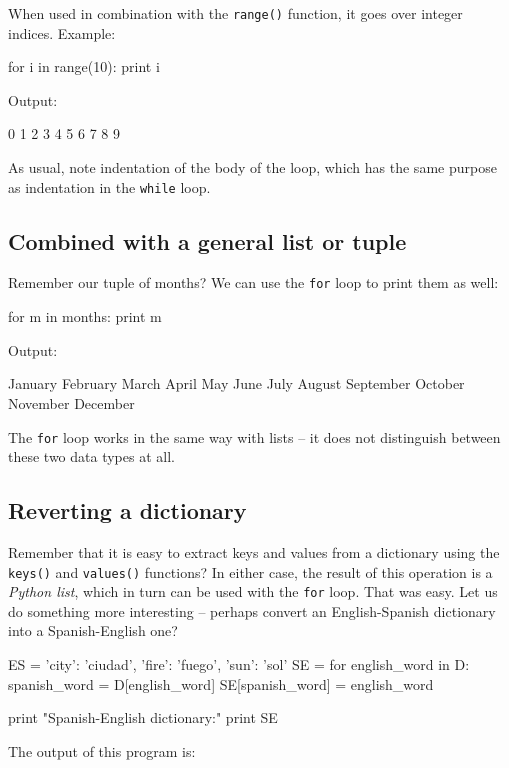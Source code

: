When used in combination with the {\tt range()} function, it goes over integer indices. 
Example:

\begin{bluecode}
for i in range(10):
    print i
\end{bluecode}
Output:

\begin{greencode}
0
1
2
3
4
5
6
7
8
9
\end{greencode}
As usual, note indentation of the body of the loop, which has the same 
purpose as indentation in the {\tt while} loop. 

\subsection{Combined with a general list or tuple}

Remember our tuple of months? We can use the {\tt for} loop to print them as well:

\begin{bluecode}
for m in months:
    print m
\end{bluecode}
Output:

\begin{greencode}
January
February
March
April
May
June
July
August
September
October
November
December
\end{greencode}
The {\tt for} loop works in the same way with lists -- it does not distinguish between these 
two data types at all.

\subsection{Reverting a dictionary}

Remember that it is easy to extract keys and values from a dictionary using the 
{\tt keys()} and {\tt values()} functions? In either case, the result of this operation 
is a {\em Python list}, which in turn can be used with the {\tt for} loop. That was easy. Let us do something more interesting -- 
perhaps convert an English-Spanish dictionary into a Spanish-English one? 

\begin{bluecode}
ES = {'city': 'ciudad', 'fire': 'fuego', 'sun': 'sol'}
SE = {}
for english_word in D:
    spanish_word = D[english_word]
    SE[spanish_word] = english_word
    
print "Spanish-English dictionary:"
print SE
\end{bluecode}
The output of this program is:

